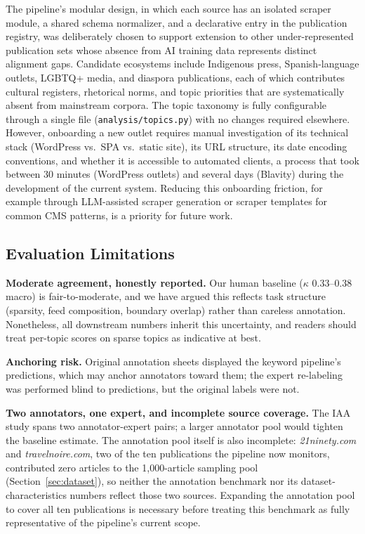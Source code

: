 \documentclass[letterpaper]{article}
\begin{document}
The pipeline's modular design, in which each source has an isolated
scraper module, a shared schema normalizer, and a declarative entry in
the publication registry, was deliberately chosen to support extension
to other under-represented publication sets whose absence from AI
training data represents distinct alignment gaps. Candidate ecosystems
include Indigenous press, Spanish-language outlets, LGBTQ+ media, and
diaspora publications, each of which contributes cultural registers,
rhetorical norms, and topic priorities that are systematically absent
from mainstream corpora. The topic taxonomy is fully configurable
through a single file (\texttt{analysis/topics.py}) with no changes
required elsewhere. However, onboarding a new outlet requires manual
investigation of its technical stack (WordPress vs.\ SPA vs.\ static
site), its URL structure, its date encoding conventions, and whether it
is accessible to automated clients, a process that took between 30
minutes (WordPress outlets) and several days (Blavity) during the
development of the current system. Reducing this onboarding friction,
for example through LLM-assisted scraper generation or scraper
templates for common CMS patterns, is a priority for future work.

\subsection{Evaluation Limitations}

\textbf{Moderate agreement, honestly reported.} Our human baseline
($\kappa$ 0.33--0.38 macro) is fair-to-moderate, and we have argued this
reflects task structure (sparsity, feed composition, boundary overlap)
rather than careless annotation. Nonetheless, all downstream numbers
inherit this uncertainty, and readers should treat per-topic scores on
sparse topics as indicative at best.

\textbf{Anchoring risk.} Original annotation sheets displayed the
keyword pipeline's predictions, which may anchor annotators toward
them; the expert re-labeling was performed blind to predictions, but the
original labels were not.

\textbf{Two annotators, one expert, and incomplete source coverage.}
The IAA study spans two annotator-expert pairs; a larger annotator pool
would tighten the baseline estimate. The annotation pool itself is also
incomplete: \emph{21ninety.com} and \emph{travelnoire.com}, two of the
ten publications the pipeline now monitors, contributed zero articles
to the 1,000-article sampling pool (Section~\ref{sec:dataset}), so
neither the annotation benchmark nor its dataset-characteristics numbers
reflect those two sources. Expanding the annotation pool to cover all
ten publications is necessary before treating this benchmark as fully
representative of the pipeline's current scope.
\end{document}
